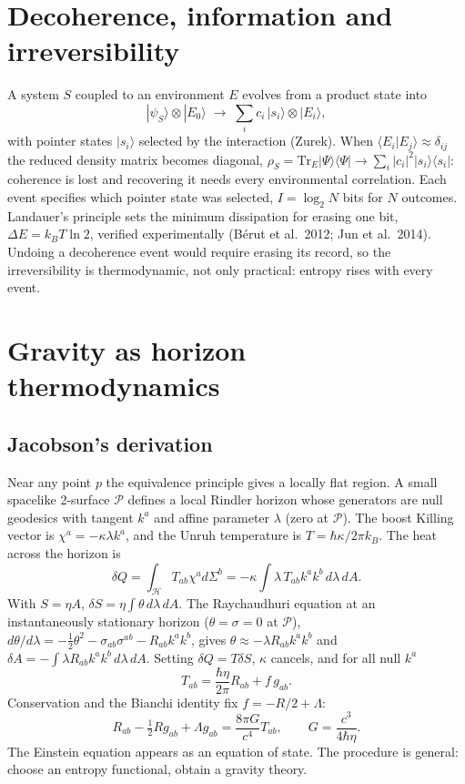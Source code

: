\section{Decoherence, information and irreversibility}
A system $S$ coupled to an environment $E$ evolves from a product state into
\begin{equation}|\psi_S\rangle\otimes|E_0\rangle\;\to\;\sum_i c_i\,|s_i\rangle\otimes|E_i\rangle ,\end{equation}
with pointer states $|s_i\rangle$ selected by the interaction (Zurek). When $\langle E_i|E_j\rangle\approx\delta_{ij}$ the reduced density matrix becomes
diagonal, $\rho_S=\mathrm{Tr}_E|\Psi\rangle\langle\Psi|\to\sum_i|c_i|^2|s_i\rangle\langle s_i|$: coherence is lost and recovering it needs every
environmental correlation. Each event specifies which pointer state was selected, $I=\log_2N$ bits for $N$ outcomes. Landauer's principle sets the minimum
dissipation for erasing one bit, $\Delta E=k_BT\ln2$, verified experimentally (B\'erut et al.\ 2012; Jun et al.\ 2014). Undoing a decoherence event would
require erasing its record, so the irreversibility is thermodynamic, not only practical: entropy rises with every event.

\section{Gravity as horizon thermodynamics}
\subsection{Jacobson's derivation}
Near any point $p$ the equivalence principle gives a locally flat region. A small spacelike 2-surface $\mathcal P$ defines a local Rindler horizon whose
generators are null geodesics with tangent $k^a$ and affine parameter $\lambda$ (zero at $\mathcal P$). The boost Killing vector is $\chi^a=-\kappa\lambda k^a$,
and the Unruh temperature is $T=\hbar\kappa/2\pi k_B$. The heat across the horizon is
\begin{equation}\delta Q=\int_{\mathcal H}T_{ab}\chi^a d\Sigma^b=-\kappa\int\lambda\,T_{ab}k^ak^b\,d\lambda\,dA .\end{equation}
With $S=\eta A$, $\delta S=\eta\int\theta\,d\lambda\,dA$. The Raychaudhuri equation at an instantaneously stationary horizon
($\theta=\sigma=0$ at $\mathcal P$), $d\theta/d\lambda=-\tfrac12\theta^2-\sigma_{ab}\sigma^{ab}-R_{ab}k^ak^b$, gives $\theta\approx-\lambda R_{ab}k^ak^b$ and
$\delta A=-\int\lambda R_{ab}k^ak^b\,d\lambda\,dA$. Setting $\delta Q=T\delta S$, $\kappa$ cancels, and for all null $k^a$
\begin{equation}T_{ab}=\frac{\hbar\eta}{2\pi}R_{ab}+f\,g_{ab}.\end{equation}
Conservation and the Bianchi identity fix $f=-R/2+\Lambda$:
\begin{equation}R_{ab}-\tfrac12Rg_{ab}+\Lambda g_{ab}=\frac{8\pi G}{c^4}T_{ab},\qquad G=\frac{c^3}{4\hbar\eta}.\end{equation}
The Einstein equation appears as an equation of state. The procedure is general: choose an entropy functional, obtain a gravity theory.

